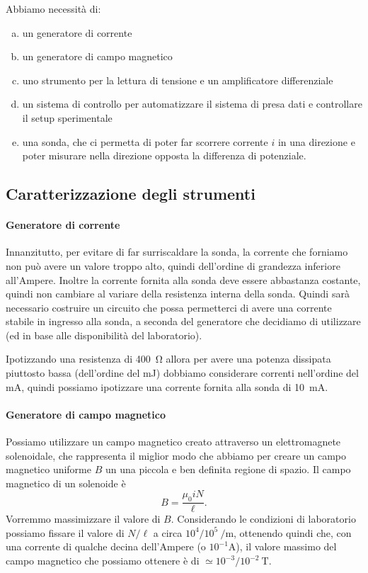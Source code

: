 \documentclass[fleqn,varvw,preprintnumbers]{memo}
\begin{document}
Abbiamo necessità di:
\begin{enumerate}[a.]
    \item un generatore di corrente
    \item un generatore di campo magnetico
    \item uno strumento per la lettura di tensione e un amplificatore differenziale
    \item un sistema di controllo per automatizzare il sistema di presa dati e controllare il setup sperimentale
    \item una sonda, che ci permetta di poter far scorrere corrente $i$ in una direzione e poter misurare nella direzione opposta la differenza di potenziale.
\end{enumerate}

\subsection{Caratterizzazione degli strumenti}
\paragraph{Generatore di corrente} Innanzitutto, per evitare di far surriscaldare la sonda, la corrente che forniamo non può avere un valore troppo alto, quindi dell'ordine di grandezza inferiore all'Ampere. Inoltre la corrente fornita alla sonda deve essere abbastanza costante, quindi non cambiare al variare della resistenza interna della sonda. Quindi sarà necessario costruire un circuito che possa permetterci di avere una corrente stabile in ingresso alla sonda, a seconda del generatore che decidiamo di utilizzare (ed in base alle disponibilità del laboratorio). 

Ipotizzando una resistenza di \SI{400}{\ohm} allora per avere una potenza dissipata piuttosto bassa (dell'ordine del \si{\milli\joule}) dobbiamo considerare correnti nell'ordine del \si{\milli\ampere}, quindi possiamo ipotizzare una corrente fornita alla sonda di \SI{10}{\milli\ampere}.

\paragraph{Generatore di campo magnetico} Possiamo utilizzare un campo magnetico creato attraverso un elettromagnete solenoidale, che rappresenta il miglior modo che abbiamo per creare un campo magnetico uniforme $B$ un una piccola e ben definita regione  di spazio. Il campo magnetico di un solenoide è \begin{equation}
    B=\frac{\mu_0iN}{\ell}. 
\end{equation} Vorremmo massimizzare il valore di $B$. Considerando le condizioni di laboratorio possiamo fissare il valore di $N/\ell$ a circa $10^4/10^5~\si{\per\metre}$, ottenendo quindi che, con una corrente di qualche decina dell'Ampere (o $10^{-1}\si{\ampere}$), il valore massimo del campo magnetico che possiamo ottenere è di $\simeq 10^{-3}/10^{-2}~\si{\tesla}$. 
\end{document}
